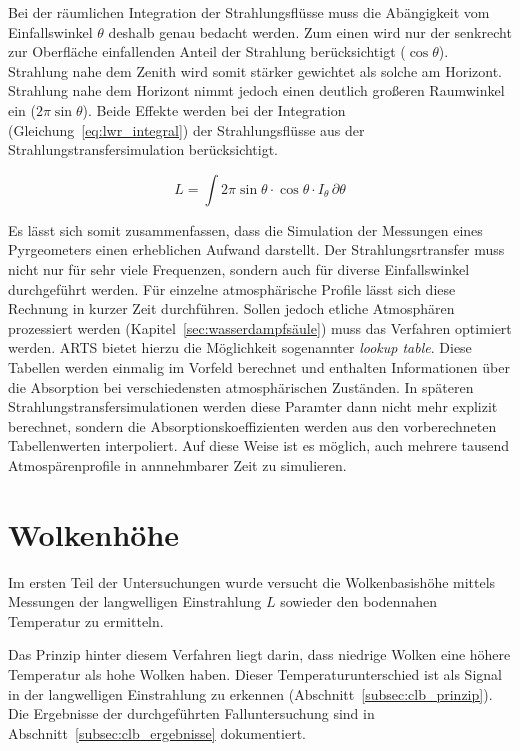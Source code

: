 \documentclass[10pt,a4paper,compsoc,peer review papers]{IEEEtran}
\begin{document}
Bei der räumlichen Integration der Strahlungsflüsse muss die Abängigkeit vom
Einfallswinkel $\theta$ deshalb genau bedacht werden. Zum einen wird nur der
senkrecht zur Oberfläche einfallenden Anteil der Strahlung berücksichtigt
($\cos\theta$). Strahlung nahe dem Zenith wird somit stärker gewichtet als
solche am Horizont. Strahlung nahe dem Horizont nimmt jedoch einen deutlich
großeren Raumwinkel ein ($2\pi\sin\theta$). Beide Effekte werden bei der
Integration (Gleichung~\ref{eq:lwr_integral}) der Strahlungsflüsse aus der
Strahlungstransfersimulation berücksichtigt.

\begin{equation}\label{eq:lwr_integral}
    L = \int 2\pi \sin\theta \cdot \cos\theta \cdot I_\theta \,\partial\theta
\end{equation}

Es lässt sich somit zusammenfassen, dass die Simulation der Messungen eines
Pyrgeometers einen erheblichen Aufwand darstellt. Der Strahlungsrtransfer muss
nicht nur für sehr viele Frequenzen, sondern auch für diverse Einfallswinkel
durchgeführt werden. Für einzelne atmosphärische Profile lässt sich diese
Rechnung in kurzer Zeit durchführen. Sollen jedoch etliche Atmosphären
prozessiert werden (Kapitel~\ref{sec:wasserdampfsäule}) muss das Verfahren
optimiert werden. ARTS bietet hierzu die Möglichkeit sogenannter
\textit{lookup table}. Diese Tabellen werden einmalig im Vorfeld berechnet
und enthalten Informationen über die Absorption bei verschiedensten
atmosphärischen Zuständen. In späteren Strahlungstransfersimulationen werden
diese Paramter dann nicht mehr explizit berechnet, sondern die
Absorptionskoeffizienten werden aus den vorberechneten Tabellenwerten
interpoliert. Auf diese Weise ist es möglich, auch mehrere tausend
Atmospärenprofile in annnehmbarer Zeit zu simulieren.

\section{Wolkenhöhe}\label{sec:wolkenhoehe}
Im ersten Teil der Untersuchungen wurde versucht die Wolkenbasishöhe mittels
Messungen der langwelligen Einstrahlung $L$ sowieder den bodennahen Temperatur
zu ermitteln.

Das Prinzip hinter diesem Verfahren liegt darin, dass niedrige Wolken eine
höhere Temperatur als hohe Wolken haben. Dieser Temperaturunterschied ist als
Signal in der langwelligen Einstrahlung zu erkennen
(Abschnitt~\ref{subsec:clb_prinzip}). Die Ergebnisse der durchgeführten
Falluntersuchung sind in Abschnitt~\ref{subsec:clb_ergebnisse} dokumentiert.
\end{document}
